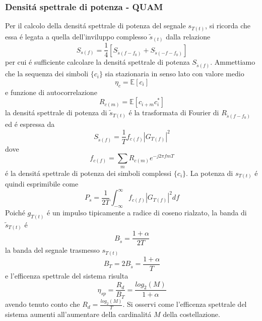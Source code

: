         \subsubsection{Densitá spettrale di potenza - QUAM}
            Per il calcolo della densitá spettrale di potenza del segnale $s_{T(t)}$, si ricorda che essa é legata a quella dell'inviluppo
            complesso $\tilde{s}_{(t)}$ dalla relazione
            \[
                S_{s(f)} = \frac{1}{4}\left[S_{\tilde{s}{(f-f_0)}}+ S_{\tilde{s}{(-f-f_0)}}\right]    
            \]
            per cui é sufficiente calcolare la densitá spettrale di potenza $S_{\tilde{s}(f)}$. Ammettiamo che la sequenza dei 
            simboli $\{c_i\}$ sia stazionaria in senso lato con valore medio 
            \[
                \eta_c=\mathbb{E}[c_i]    
            \] 
            e funzione di autocorrelazione
            \[
                R_{c(m)} = \mathbb{E}[c_{i+m}c^\ast_i]    
            \]
            la densitá spettrale di potenza di $\tilde{s}_{T(t)}$ é la trasformata di Fourier di $R_{\tilde{s}{(f-f_0)}}$ ed é espressa da
            \[
                S_{\tilde{s}{(f)}} = \frac{1}{T} f_{c(f)}\left|G_{T(f)}\right|^2    
            \]
            dove 
            \[
                f_{c(f)} = \sum_{m}R_{c(m)}e^{-j2\pi fmT}
            \]
            é la densitá spettrale di potenza dei simboli complessi $\{c_i\}$. La potenza di $s_{T(t)}$ é quindi esprimibile come
            \[
                P_s=\frac{1}{2T} \int_{-\infty}^{\infty} f_{c(f)} \left|G_{T(f)}\right|^2 df
            \]
            Poiché $g_{T(t)}$ é un impulso tipicamente a radice di coseno rialzato, la banda di $\tilde{s}_{T(t)}$ é 
            \[
                B_{\tilde{s}}=\frac{1+\alpha}{2T}    
            \]
            la banda del segnale trasmesso $s_{T(t)}$ 
            \[
                B_{T}=2B_{\tilde{s}} =\frac{1+\alpha}{T}
            \]
            e l'efficenza spettrale del sistema risulta 
            \[
                \eta_{sp} = \frac{R_d}{B_T} = \frac{log_2(M)}{1+\alpha} 
            \]
            avendo tenuto conto che $R_d = \frac{log_2(M)}{T}$. Si osservi come l'efficenza spettrale del sistema aumenti all'aumentare 
            della cardinalitá $M$ della costellazione.
